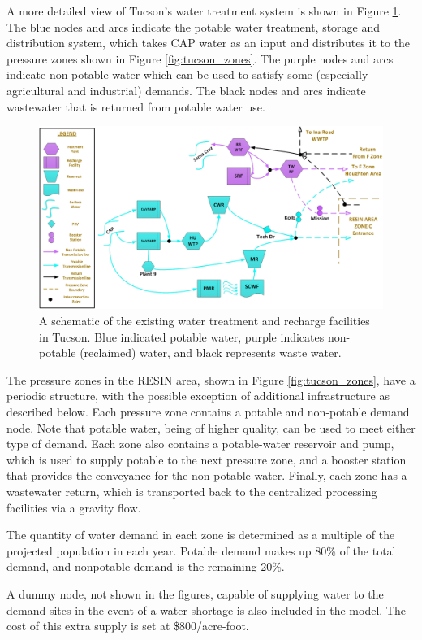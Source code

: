 \documentclass[opre,nonblindrev]{informs3} %
\begin{document}
A more detailed view of Tucson's water treatment system is shown in Figure \ref{fig:tucson_treatment}.
The blue nodes and arcs indicate the potable water treatment, storage and distribution system, which takes CAP water as an input and distributes it to the pressure zones shown in Figure \ref{fig:tucson_zones}.
The purple nodes and arcs indicate non-potable water which can be used to satisfy some (especially agricultural and industrial) demands.
The black nodes and arcs indicate wastewater that is returned from potable water use.

\begin{figure}
	\FIGURE
	{%
		\includegraphics*[width=.8\textwidth]{tucson_water_images/nodes_central.png}%
	}
	{
		A schematic of the existing water treatment and recharge facilities in Tucson.
		Blue indicated potable water, purple indicates non-potable (reclaimed) water, and black represents waste water.
		\label{fig:tucson_treatment}
	}
	{}
\end{figure}

The pressure zones in the RESIN area, shown in Figure \ref{fig:tucson_zones}, have a periodic structure, with the possible exception of additional infrastructure as described below.
Each pressure zone contains a potable and non-potable demand node.
Note that potable water, being of higher quality, can be used to meet either type of demand.
Each zone also contains a potable-water reservoir and pump, which is used to supply potable to the next pressure zone, and a booster station that provides the conveyance for the non-potable water.
Finally, each zone has a wastewater return, which is transported back to the centralized processing facilities via a gravity flow.

The quantity of water demand in each zone is determined as a multiple of the projected population in each year.
Potable demand makes up 80\% of the total demand, and nonpotable demand is the remaining 20\%.

A dummy node, not shown in the figures, capable of supplying water to the demand sites in the event of a water shortage is also included in the model.
The cost of this extra supply is set at \$800/acre-foot.
\end{document}
